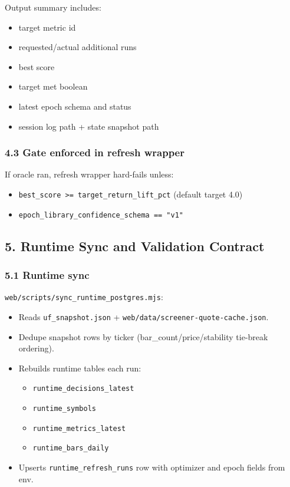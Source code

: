 \documentclass[
]{article}
\providecommand{\tightlist}{%
  \setlength{\itemsep}{0pt}\setlength{\parskip}{0pt}}
\begin{document}
Output summary includes:

\begin{itemize}
\tightlist
\item
  target metric id
\item
  requested/actual additional runs
\item
  best score
\item
  target met boolean
\item
  latest epoch schema and status
\item
  session log path + state snapshot path
\end{itemize}

\subsubsection{4.3 Gate enforced in refresh
wrapper}\label{43-gate-enforced-in-refresh-wrapper}

If oracle ran, refresh wrapper hard-fails unless:

\begin{itemize}
\tightlist
\item
  \texttt{best\_score\ \textgreater{}=\ target\_return\_lift\_pct}
  (default target 4.0)
\item
  \texttt{epoch\_library\_confidence\_schema\ ==\ "v1"}
\end{itemize}

\subsection{5. Runtime Sync and Validation
Contract}\label{5-runtime-sync-and-validation-contract}

\subsubsection{5.1 Runtime sync}\label{51-runtime-sync}

\texttt{web/scripts/sync\_runtime\_postgres.mjs}:

\begin{itemize}
\tightlist
\item
  Reads \texttt{uf\_snapshot.json} +
  \texttt{web/data/screener-quote-cache.json}.
\item
  Dedupe snapshot rows by ticker (bar\_count/price/stability tie-break
  ordering).
\item
  Rebuilds runtime tables each run:

  \begin{itemize}
  \tightlist
  \item
    \texttt{runtime\_decisions\_latest}
  \item
    \texttt{runtime\_symbols}
  \item
    \texttt{runtime\_metrics\_latest}
  \item
    \texttt{runtime\_bars\_daily}
  \end{itemize}
\item
  Upserts \texttt{runtime\_refresh\_runs} row with optimizer and epoch
  fields from env.
\end{itemize}
\end{document}
